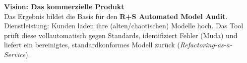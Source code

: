 \documentclass[a4paper,10pt]{article}
\begin{document}
\vspace{0.4cm}

\begin{productbox}
    \textbf{Vision: Das kommerzielle Produkt}\\
    Das Ergebnis bildet die Basis für den \textbf{\glqq R+S Automated Model Audit\grqq}.\\
    Dienstleistung: Kunden laden ihre (alten/chaotischen) Modelle hoch. Das Tool prüft diese vollautomatisch gegen Standards, identifiziert Fehler (\glqq Muda\grqq) und liefert ein bereinigtes, standardkonformes Modell zurück (\textit{Refactoring-as-a-Service}).
\end{productbox}
\end{document}
